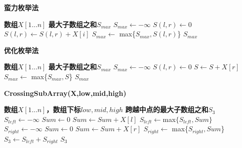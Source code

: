 \documentclass{article}
\begin{document}
\begin{CJK}{UTF8}{gbsn}
    \begin{algorithm}
            \caption{\textbf{蛮力枚举法}}
            \begin{algorithmic}[1]
                \Require \textbf{数组$X[1...n]$}
                \Ensure \textbf{最大子数组之和$S_{max}$}
                \State $S_{max} \leftarrow -\infty$
                        \State $S(l,r) \leftarrow 0$
                            \State $S(l,r) \leftarrow S(l,r)+X[i]$
                        \EndFor
                        \State $S_{max} \leftarrow$ max\{$S_{max},S(l,r)$\}
                    \EndFor
                \EndFor
                \State \Return $S_{max}$
        \end{algorithmic}
    \end{algorithm}

    \begin{algorithm}
        \caption{\textbf{优化枚举法}}
        \begin{algorithmic}[1]
            \Require \textbf{数组$X[1...n]$}
            \Ensure \textbf{最大子数组之和$S_{max}$}
            \State $S_{max} \leftarrow -\infty$
                \State $S(l,r) \leftarrow 0$
                    \State $S \leftarrow S+X[r]$
                    \State $S_{max} \leftarrow$ max\{$S_{max},S$\}
                \EndFor
            \EndFor
            \State \Return $S_{max}$
        \end{algorithmic}
    \end{algorithm}

    \begin{algorithm}
            \caption{\textbf{CrossingSubArray(X,low,mid,high)}}
            \begin{algorithmic}[1]
                \Require \textbf{数组$X[1...n]$，数组下标$low,mid,high$}
                \Ensure \textbf{跨越中点的最大子数组之和$S_3$}
                \State $S_{left} \leftarrow -\infty$
                \State $Sum \leftarrow 0$
                    \State $Sum \leftarrow Sum+X[l]$
                    \State $S_{left} \leftarrow $max$\{S_{left},Sum\}$
                \EndFor
                \State $S_{right} \leftarrow -\infty$
                \State $Sum \leftarrow 0$
                    \State $Sum \leftarrow Sum+X[r]$
                    \State $S_{right} \leftarrow$ max\{$S_{right},Sum$\}
                \EndFor
                \State $S_3 \leftarrow S_{left}+S_{right}$
                \State \Return $S_3$
        \end{algorithmic}
    \end{algorithm}


\end{CJK}
\end{document}
